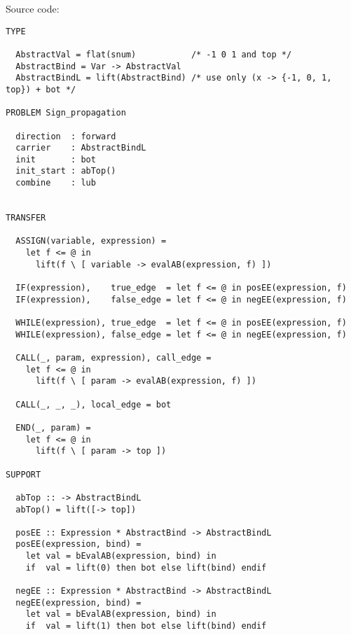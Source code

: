\documentclass[a4paper]{article}
\begin{document}
Source code:

\begin{verbatim}
TYPE

  AbstractVal = flat(snum)           /* -1 0 1 and top */
  AbstractBind = Var -> AbstractVal
  AbstractBindL = lift(AbstractBind) /* use only (x -> {-1, 0, 1, top}) + bot */

PROBLEM Sign_propagation

  direction  : forward
  carrier    : AbstractBindL
  init       : bot
  init_start : abTop()
  combine    : lub


TRANSFER

  ASSIGN(variable, expression) =
    let f <= @ in
      lift(f \ [ variable -> evalAB(expression, f) ])

  IF(expression),    true_edge  = let f <= @ in posEE(expression, f)
  IF(expression),    false_edge = let f <= @ in negEE(expression, f)

  WHILE(expression), true_edge  = let f <= @ in posEE(expression, f)
  WHILE(expression), false_edge = let f <= @ in negEE(expression, f)

  CALL(_, param, expression), call_edge = 
    let f <= @ in
      lift(f \ [ param -> evalAB(expression, f) ])

  CALL(_, _, _), local_edge = bot

  END(_, param) =
    let f <= @ in
      lift(f \ [ param -> top ])

SUPPORT

  abTop :: -> AbstractBindL
  abTop() = lift([-> top])

  posEE :: Expression * AbstractBind -> AbstractBindL
  posEE(expression, bind) =
    let val = bEvalAB(expression, bind) in
    if  val = lift(0) then bot else lift(bind) endif

  negEE :: Expression * AbstractBind -> AbstractBindL
  negEE(expression, bind) =
    let val = bEvalAB(expression, bind) in
    if  val = lift(1) then bot else lift(bind) endif



\end{verbatim}
\end{document}
